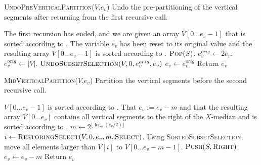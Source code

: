 \begin{algorithm}

  \caption{\textsc{UndoPreVerticalPartition}(${V}$,$e_v$)
  Undo the pre-partitioning of the vertical segments after returning
  from the first recursive call.}
  \label{algUndoPreVP}
  \begin{algorithmic}[1]
    \REQUIRE The first recursion has ended, and we are given an array 
    ${V}[0\ldots e_v-1]$ that is sorted according to \LU.
    \ENSURE  The variable $e_v$ has been reset to its original value and 
    the resulting array ${V}[0\ldots e_v-1]$ is sorted 
    according to \LU.
    \STATE $\textsc{Pop}(S)$.
      \STATE $e_v^{orig} \leftarrow 2e_v$.
    \ELSE
      \STATE $e_v^{orig} \leftarrow |V|$.
    \ENDIF
    \STATE $\textsc{UndoSubsetSelection}({V},0,e_v^{orig},e_v)$
    \STATE $e_v \leftarrow e_v^{orig}$
    \STATE Return $e_v$
 \end{algorithmic}
\end{algorithm}


\begin{algorithm}
  \caption{\textsc{MidVerticalPartition}(${V}$,$e_v$) Partition
  the vertical segments before the second recursive call.} 
  \label{algMidVP}
  \begin{algorithmic}[1]
    \REQUIRE ${V}[0\ldots e_v-1]$ is sorted according to \LU.
    \ENSURE That $e_v := e_v - m$ and that the resulting array 
    ${V}[0\ldots e_v]$ contains all vertical segments to the right of 
    the $X$-median and is sorted according to \LU.
    \STATE $m \leftarrow 2^{\lfloor \log_2 (e_v/2) \rfloor}$
    \STATE $i \leftarrow 
         \textsc{RestoringSelect}({V},0,e_v,m,\textsc{Select})$. 
    \STATE Using \textsc{SortedSubsetSelection}, move all elements
    larger than ${V}[i]$ to ${V}[0\ldots e_v - m-1 ]$.
    \STATE $\textsc{Push}(S,\textsc{Right})$.
    \STATE $e_v \leftarrow e_v-m$
    \STATE Return $e_v$
 \end{algorithmic}
\end{algorithm}

